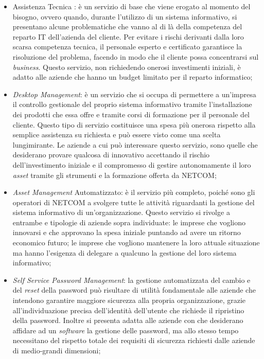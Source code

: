 \begin{itemize}
    \item Assistenza Tecnica : è un servizio di base che viene erogato al momento del bisogno, ovvero quando, durante l'utilizzo di un sistema informativo, si presentano alcune problematiche che vanno al di là della competenza del reparto IT dell’azienda del cliente. 
    Per evitare i rischi derivanti dalla loro scarsa competenza tecnica, il personale esperto e certificato garantisce la risoluzione del problema, facendo in modo che il cliente possa concentrarsi sul \emph{business}.
    Questo servizio, non richiedendo onerosi investimenti iniziali, è adatto alle aziende che hanno un budget limitato per il reparto informatico;
    \item \emph{Desktop Management}: è un servizio che si occupa di permettere a un’impresa il controllo gestionale del proprio sistema informativo tramite l’installazione dei prodotti che essa offre e tramite corsi di formazione per il personale del cliente. Questo tipo di servizio costituisce una spesa più onerosa rispetto alla semplice assistenza su richiesta e può essere visto come una scelta lungimirante. 
    Le aziende a cui può interessare questo servizio, sono quelle che desiderano provare qualcosa di innovativo accettando il rischio dell’investimento iniziale e il compromesso di gestire autonomamente il loro \emph{asset} tramite gli strumenti e la formazione offerta da NETCOM;
    \item \emph{Asset Management} Automatizzato: è il servizio più completo, poiché sono gli operatori di NETCOM a svolgere tutte le attività riguardanti la gestione del sistema informativo di un’organizzazione.
    Questo servizio si rivolge a entrambe e tipologie di aziende sopra individuate: le imprese che vogliono innovarsi e che approvano la spesa iniziale puntando ad avere un ritorno economico futuro; le imprese che vogliono mantenere la loro attuale situazione ma hanno l’esigenza di delegare a qualcuno la gestione del loro sistema informativo;
    \item \emph{Self Service Password Management}: la gestione automatizzata del cambio e del \emph{reset} della password può risultare di utilità fondamentale alle aziende che intendono garantire maggiore sicurezza alla propria organizzazione, grazie all’individuazione precisa dell’identità dell’utente che richiede il ripristino della password. Inoltre si presenta adatta alle aziende con  che desiderano affidare ad un \emph{software} la gestione delle password, ma allo stesso tempo necessitano del rispetto totale dei requisiti di sicurezza richiesti dalle aziende di medio-grandi dimensioni;

\end{itemize}
